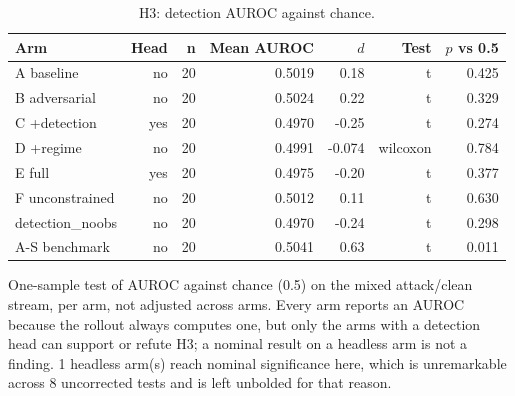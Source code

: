 \begin{table}[htbp]
  \centering
  \caption{H3: detection AUROC against chance.}
  \label{tab:auroc}
  \begin{tabular}{lrrrrrr}
    \toprule
    Arm & Head & n & Mean AUROC & $d$ & Test & $p$ vs 0.5 \\
    \midrule
    A  baseline & no & 20 & 0.5019 & 0.18 & t & 0.425 \\
    B  adversarial & no & 20 & 0.5024 & 0.22 & t & 0.329 \\
    C  +detection & yes & 20 & 0.4970 & -0.25 & t & 0.274 \\
    D  +regime & no & 20 & 0.4991 & -0.074 & wilcoxon & 0.784 \\
    E  full & yes & 20 & 0.4975 & -0.20 & t & 0.377 \\
    F  unconstrained & no & 20 & 0.5012 & 0.11 & t & 0.630 \\
    detection\_noobs & no & 20 & 0.4970 & -0.24 & t & 0.298 \\
    A-S benchmark & no & 20 & 0.5041 & 0.63 & t & 0.011 \\
    \bottomrule
  \end{tabular}
  \begin{minipage}{\linewidth}\vspace{4pt}\footnotesize One-sample test of AUROC against chance (0.5) on the mixed attack/clean stream, per arm, not adjusted across arms. Every arm reports an AUROC because the rollout always computes one, but only the arms with a detection head can support or refute H3; a nominal result on a headless arm is not a finding. 1 headless arm(s) reach nominal significance here, which is unremarkable across 8 uncorrected tests and is left unbolded for that reason.\end{minipage}
\end{table}

